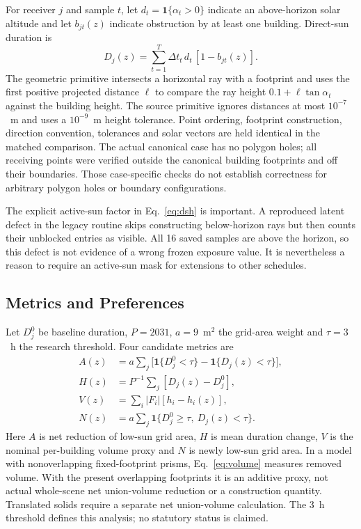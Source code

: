 \documentclass{llncs}
\newcommand{\ind}{\mathbf{1}}
\begin{document}
For receiver $j$ and sample $t$, let $d_t=\ind\{\alpha_t>0\}$ indicate an above-horizon solar altitude and let $b_{jt}(z)$ indicate obstruction by at least one building. Direct-sun duration is
\begin{equation}
 D_j(z)=\sum_{t=1}^{T}\Delta t_t\,d_t\,[1-b_{jt}(z)].
 \label{eq:dsh}
\end{equation}
The geometric primitive intersects a horizontal ray with a footprint and uses the first positive projected distance $\ell$ to compare the ray height $0.1+\ell\tan\alpha_t$ against the building height. The source primitive ignores distances at most $10^{-7}$~m and uses a $10^{-9}$~m height tolerance. Point ordering, footprint construction, direction convention, tolerances and solar vectors are held identical in the matched comparison. The actual canonical case has no polygon holes; all receiving points were verified outside the canonical building footprints and off their boundaries. Those case-specific checks do not establish correctness for arbitrary polygon holes or boundary configurations.

The explicit active-sun factor in Eq.~\ref{eq:dsh} is important. A reproduced latent defect in the legacy routine skips constructing below-horizon rays but then counts their unblocked entries as visible. All 16 saved samples are above the horizon, so this defect is not evidence of a wrong frozen exposure value. It is nevertheless a reason to require an active-sun mask for extensions to other schedules.

\subsection{Metrics and Preferences}
Let $D_j^0$ be baseline duration, $P=2031$, $a=9$~m$^2$ the grid-area weight and $\tau=3$~h the research threshold. Four candidate metrics are
\begin{align}
 A(z)&=a\sum_j\big[\ind\{D_j^0<\tau\}-\ind\{D_j(z)<\tau\}\big],\label{eq:area}\\
 H(z)&=P^{-1}\sum_j[D_j(z)-D_j^0],\label{eq:hours}\\
 V(z)&=\sum_i |F_i|[h_i-h_i(z)],\label{eq:volume}\\
 N(z)&=a\sum_j\ind\{D_j^0\geq\tau,\ D_j(z)<\tau\}.\label{eq:new}
\end{align}
Here $A$ is net reduction of low-sun grid area, $H$ is mean duration change, $V$ is the nominal per-building volume proxy and $N$ is newly low-sun grid area. In a model with nonoverlapping fixed-footprint prisms, Eq.~\ref{eq:volume} measures removed volume. With the present overlapping footprints it is an additive proxy, not actual whole-scene net union-volume reduction or a construction quantity. Translated solids require a separate net union-volume calculation. The 3~h threshold defines this analysis; no statutory status is claimed.
\end{document}
